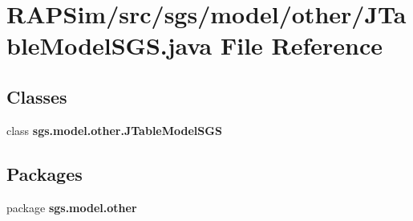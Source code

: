 \section{R\-A\-P\-Sim/src/sgs/model/other/\-J\-Table\-Model\-S\-G\-S.java File Reference}
\label{_j_table_model_s_g_s_8java}
\subsection*{Classes}
\begin{DoxyCompactItemize}
\item 
class {\bf sgs.\-model.\-other.\-J\-Table\-Model\-S\-G\-S}
\end{DoxyCompactItemize}
\subsection*{Packages}
\begin{DoxyCompactItemize}
\item 
package {\bf sgs.\-model.\-other}
\end{DoxyCompactItemize}
